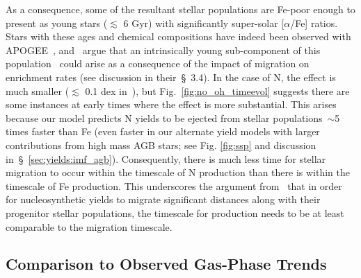 \documentclass[ms.tex]{subfiles}
\begin{document}
As a consequence, some of the resultant stellar populations are Fe-poor enough
to present as young stars ($\lesssim$ 6 Gyr) with significantly super-solar
[$\alpha$/Fe] ratios.
Stars with these ages and chemical compositions have indeed been observed with
APOGEE~\citep{Chiappini2015, Martig2015, Martig2016, Jofre2016, Yong2016,
Izzard2018, SilvaAguirre2018, Miglio2021}, and~\citet{Johnson2021} argue that
an intrinsically young sub-component of this population~\citep{Hekker2019}
could arise as a consequence of the impact of migration on enrichment rates
(see discussion in their~\S~3.4).
In the case of N, the effect is much smaller ($\lesssim$ 0.1 dex in~\no),
but Fig.~\ref{fig:no_oh_timeevol} suggests there are some instances at early
times where the effect is more substantial.
This arises because our model predicts N yields to be ejected from stellar
populations~$\sim$5 times faster than Fe (even faster in our alternate yield
models with larger contributions from high mass AGB stars; see Fig.
\ref{fig:ssp} and discussion in~\S~\ref{sec:yields:imf_agb}).
Consequently, there is much less time for stellar migration to occur within the
timescale of N production than there is within the timescale of Fe production.
This underscores the argument from~\citet{Johnson2021} that in order for
nucleosynthetic yields to migrate significant distances along with their
progenitor stellar populations, the timescale for production needs to be at
least comparable to the migration timescale.

\subsection{Comparison to Observed Gas-Phase Trends}
\label{sec:results:yields}
\end{document}
